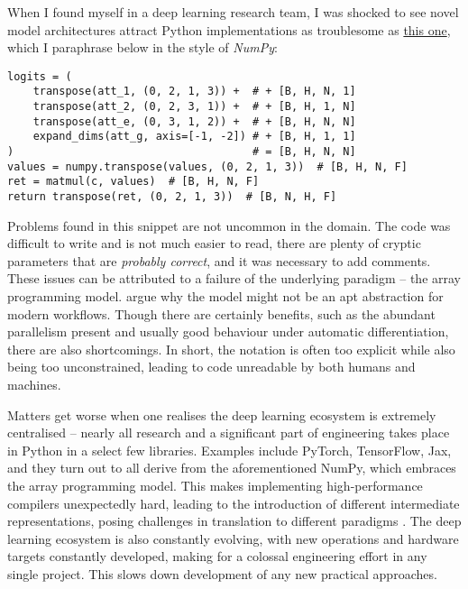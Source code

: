 When I found myself in a deep learning research team, I was shocked to see novel model architectures attract Python implementations as troublesome as \href{https://github.com/google-deepmind/clrs/blob/8697f51663bd77548f4b3108816c84d163883361/clrs/_src/processors.py#L140}{this one}, which I paraphrase below in the style of \textit{NumPy}:
\begin{center} \begin{minipage}{0.65\textwidth}
\begin{verbatim}
logits = (
    transpose(att_1, (0, 2, 1, 3)) +  # + [B, H, N, 1]
    transpose(att_2, (0, 2, 3, 1)) +  # + [B, H, 1, N]
    transpose(att_e, (0, 3, 1, 2)) +  # + [B, H, N, N]
    expand_dims(att_g, axis=[-1, -2]) # + [B, H, 1, 1]
)                                     # = [B, H, N, N]
values = numpy.transpose(values, (0, 2, 1, 3))  # [B, H, N, F]
ret = matmul(c, values)  # [B, H, N, F]
return transpose(ret, (0, 2, 1, 3))  # [B, N, H, F]
\end{verbatim}
\end{minipage} \end{center}
Problems found in this snippet are not uncommon in the domain. The code was difficult to write and is not much easier to read, there are plenty of cryptic parameters that are \textit{probably correct}, and it was necessary to add comments. These issues can be attributed to a failure of the underlying paradigm -- the array programming model. \textcite{paszke2021getting} argue why the model might not be an apt abstraction for modern workflows. Though there are certainly benefits, such as the abundant parallelism present and usually good behaviour under automatic differentiation, there are also shortcomings. In short, the notation is often too explicit while also being too unconstrained, leading to code unreadable by both humans and machines. 

Matters get worse when one realises the deep learning ecosystem is extremely centralised -- nearly all research and a significant part of engineering takes place in Python in a select few libraries. Examples include PyTorch, TensorFlow, Jax, and they turn out to all derive from the aforementioned NumPy, which embraces the array programming model. 
This makes implementing high-performance compilers unexpectedly hard, leading to the introduction of different intermediate representations, posing challenges in translation to different paradigms \cite{feng2023tensorir}. The deep learning ecosystem is also constantly evolving, with new operations and hardware targets constantly developed, making for a colossal engineering effort in any single project. This slows down development of any new practical approaches.

